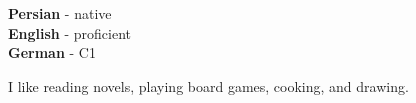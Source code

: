 \documentclass[9pt]{developercv} %
\begin{document}
	\begin{minipage}[t]{0.3\textwidth}
	    \vspace{-\baselineskip} %


		\textbf{Persian} - native\\
		\textbf{English} - proficient\\
		\textbf{German} - C1
	\end{minipage}
    \hfill
	\begin{minipage}[t]{0.5\textwidth}
	    \vspace{-\baselineskip} %


		I like reading novels, playing board games, cooking, and drawing.
	\end{minipage}
	\hfill
    \vfill

	
\end{document}
